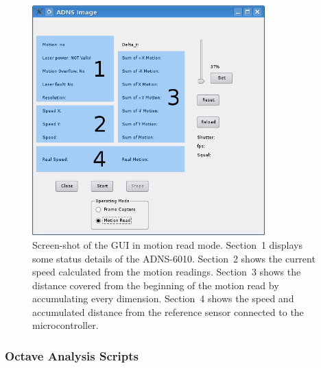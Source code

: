 \documentclass[12pt,a4paper]{article}
\begin{document}
\begin{figure}[htbp]
\begin{center}
\includegraphics[width=0.8\textwidth]{figures/gui-motion-wtags.png}
\caption{\label{fig:gui-motion}
Screen-shot of the GUI in motion read mode.
Section~1 displays some status details of the ADNS-6010.
Section~2 shows the current speed calculated from the motion readings.
Section~3 shows the distance covered from the beginning of the motion read by accumulating every dimension.
Section~4 shows the speed and accumulated distance from the reference sensor connected to the microcontroller.
}
\end{center}
\end{figure}


\subsubsection{Octave Analysis Scripts}
\label{octave}
\end{document}
